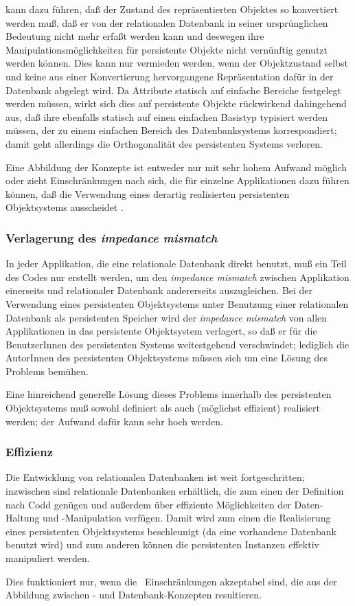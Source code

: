 \representationform{} kann dazu f\"{u}hren, da\ss{} der Zustand des
repr\"{a}sentierten Objektes so konvertiert werden mu\ss{}, da\ss{} er von der
relationalen Datenbank in seiner urspr\"{u}nglichen Bedeutung nicht mehr
erfa\ss{}t werden kann und deswegen ihre Manipulationsm\"{o}glichkeiten f\"{u}r
persistente Objekte nicht vern\"{u}nftig genutzt werden k\"{o}nnen. Dies
kann nur vermieden werden, wenn der Objektzustand selbst und keine aus
einer Konvertierung hervorgangene Repr\"{a}sentation daf\"{u}r in der
Datenbank abgelegt wird. Da Attribute statisch auf einfache Bereiche
festgelegt werden m\"{u}ssen, wirkt sich dies auf persistente Objekte
r\"{u}ckwirkend dahingehend aus, da\ss{} ihre \Slt[s]\/ ebenfalls statisch
auf einen einfachen Basistyp typisiert werden m\"{u}ssen, der zu einem
einfachen Bereich des Datenbanksystems korrespondiert; damit geht
allerdings die Orthogonalit\"{a}t des persistenten Systems verloren.
%
\par{}Eine Abbildung der Konzepte ist entweder nur mit sehr
hohem Aufwand m\"{o}glich oder zieht Einschr\"{a}nkungen nach sich, die f\"{u}r
einzelne Applikationen dazu f\"{u}hren k\"{o}nnen, da\ss{} die Verwendung eines
derartig realisierten persistenten Objektsystems ausscheidet
\cite[]{bib:broe89} \cite[]{bib:ni88}.
%
\subsubsection{Verlagerung des {\em impedance mismatch}}%
%
In jeder Applikation, die eine relationale Datenbank direkt benutzt,
mu\ss{} ein Teil des Codes nur erstellt werden, um den {\em impedance
mismatch\/} zwischen Applikation einerseits und relationaler Datenbank
andererseits auszugleichen. Bei der Verwendung eines persistenten
Objektsystems unter Benutzung einer relationalen Datenbank als
persistenten Speicher wird der {\em impedance mismatch\/} von allen
Applikationen in das persistente Objektsystem verlagert, so da\ss{} er
f\"{u}r die BenutzerInnen des persistenten Systems weitestgehend
verschwindet; lediglich die AutorInnen des persistenten Objektsystems
m\"{u}ssen sich um eine L\"{o}sung des Problems bem\"{u}hen.
%
\par{}Eine hinreichend generelle L\"{o}sung dieses Problems innerhalb des
persistenten Objektsystems mu\ss{} sowohl definiert als auch (m\"{o}glichst
effizient) realisiert werden; der Aufwand daf\"{u}r kann sehr hoch
werden.
%
\subsubsection{Effizienz}%
%
Die Entwicklung von relationalen Datenbanken ist weit fortgeschritten;
inzwischen sind relationale Datenbanken erh\"{a}ltlich, die zum einen der
Definition nach Codd gen\"{u}gen und au\ss{}erdem \"{u}ber effiziente
M\"{o}glichkeiten der Daten-Haltung und -Manipulation verf\"{u}gen. Damit
wird zum einen die Realisierung eines persistenten Objektsystems
beschleunigt (da eine vorhandene Datenbank benutzt wird) und zum
anderen k\"{o}nnen die persistenten Instanzen effektiv manipuliert
werden.
%
\par{}Dies funktioniert nur, wenn die \og[en]\ Einschr\"{a}nkungen
akzeptabel sind, die aus der Abbildung zwischen
\clos- und Datenbank-Konzepten resultieren.
%
